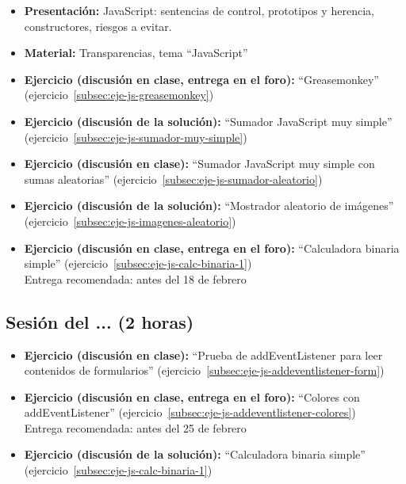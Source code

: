 \documentclass[a4paper,12pt]{report}
\begin{document}
\begin{itemize}
\item \textbf{Presentación:} JavaScript: sentencias de control, prototipos y herencia, constructores, riesgos a evitar.
\item \textbf{Material:} Transparencias, tema ``JavaScript''
\item \textbf{Ejercicio (discusión en clase, entrega en el foro):} ``Greasemonkey'' (ejercicio~\ref{subsec:eje-js-greasemonkey})
\item \textbf{Ejercicio (discusión de la solución):} ``Sumador JavaScript muy simple'' (ejercicio~\ref{subsec:eje-js-sumador-muy-simple})
\item \textbf{Ejercicio (discusión en clase):} ``Sumador JavaScript muy simple con sumas aleatorias'' (ejercicio~\ref{subsec:eje-js-sumador-aleatorio})
\item \textbf{Ejercicio (discusión de la solución):} ``Mostrador aleatorio de imágenes'' (ejercicio~\ref{subsec:eje-js-imagenes-aleatorio})
\item \textbf{Ejercicio (discusión en clase, entrega en el foro):} ``Calculadora binaria simple'' (ejercicio~\ref{subsec:eje-js-calc-binaria-1}) \\
  Entrega recomendada: antes del 18 de febrero
\end{itemize}


\subsection{Sesión del ... (2 horas)}

\begin{itemize}
\item \textbf{Ejercicio (discusión en clase):} ``Prueba de addEventListener para leer contenidos de formularios'' (ejercicio~\ref{subsec:eje-js-addeventlistener-form})
\item \textbf{Ejercicio (discusión en clase, entrega en el foro):} ``Colores con addEventListener'' (ejercicio~\ref{subsec:eje-js-addeventlistener-colores}) \\
  Entrega recomendada: antes del 25 de febrero
\item \textbf{Ejercicio (discusión de la solución):} ``Calculadora binaria simple'' (ejercicio~\ref{subsec:eje-js-calc-binaria-1})
\end{itemize}


\end{document}
